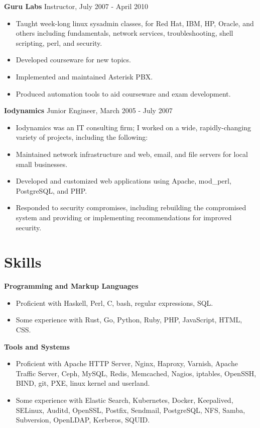 \documentclass[line]{res}
\begin{document}
\begin{resume}
\textbf{Guru Labs} Instructor, July 2007 - April 2010
\begin{itemize}
\item Taught week-long linux sysadmin classes, for Red Hat, IBM, HP, Oracle, and others including fundamentals, network services, troubleshooting, shell scripting, perl, and security.
\item Developed courseware for new topics.
\item Implemented and maintained Asterisk PBX.
\item Produced automation tools to aid courseware and exam development.
\end{itemize}

\textbf{Iodynamics} Junior Engineer, March 2005 - July 2007
\begin{itemize}
\item Iodynamics was an IT consulting firm; I worked on a wide, rapidly-changing variety of projects, including the following:
\item Maintained network infrastructure and web, email, and file servers for local small businesses.
\item Developed and customized web applications using Apache, mod\_perl, PostgreSQL, and PHP.
\item Responded to security compromises, including rebuilding the compromised system and providing or implementing recommendations for improved security.
\end{itemize}

\section{Skills}

\textbf{Programming and Markup Languages}
\begin{itemize}
\item Proficient with Haskell, Perl, C, bash, regular expressions, SQL.
\item Some experience with Rust, Go, Python, Ruby, PHP, JavaScript, HTML, CSS.
\end{itemize}

\textbf{Tools and Systems}
\begin{itemize}
\item Proficient with Apache HTTP Server, Nginx, Haproxy, Varnish, Apache Traffic Server, Ceph, MySQL, Redis, Memcached, Nagios, iptables, OpenSSH, BIND, git, PXE, linux kernel and userland.
\item Some experience with Elastic Search, Kubernetes, Docker, Keepalived, SELinux, Auditd, OpenSSL, Postfix, Sendmail, PostgreSQL, NFS, Samba, Subversion, OpenLDAP, Kerberos, SQUID.
\end{itemize}

\end{resume}
\end{document}
